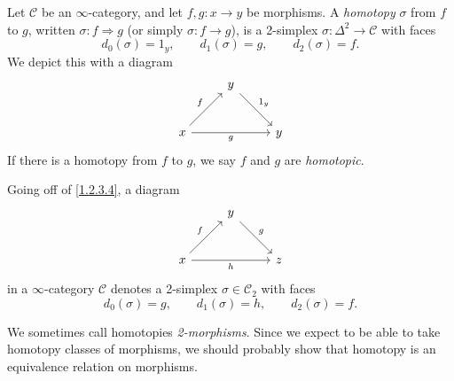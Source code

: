 \begin{definition}\label{1.2.3.4}
	Let $\mathcal{C} $ be an $\infty $-category, and let $f,g : x \to y$ be morphisms. A \emph{homotopy} $\sigma $ from $f$ to $g$, written $\sigma : f \Rightarrow g$ (or simply $\sigma : f \to g$), is a 2-simplex $\sigma : \Delta ^2 \to \mathcal{C} $ with faces
	\[
		d_0(\sigma )=1_y,\qquad d_1(\sigma )=g,\qquad d_2(\sigma )=f
	.\]
	We depict this with a diagram
	\[\begin{tikzcd}[row sep = 2.5em, column sep = 2.5em]
	 & y \ar[" 1_y ", dr]  &  \\
	x \ar[" f ", ur] \ar[" g "', rr]  &  & y
	\end{tikzcd}\]
	If there is a homotopy from $f$ to $g$, we say $f$ and $g$ are \emph{homotopic}.
\end{definition}

\begin{notation}\label{1.2.3.5}
	Going off of \cref{1.2.3.4}, a diagram
	\[\begin{tikzcd}[row sep = 2.5em, column sep = 2.5em]
	 & y \ar[" g ", dr]  &  \\
	x \ar[" f ", ur] \ar[" h "', rr]  &  & z
	\end{tikzcd}\]
	in a $\infty $-category $\mathcal{C} $ denotes a 2-simplex $\sigma \in \mathcal{C} _2$ with faces
	\[
		d_0(\sigma )=g,\qquad d_1(\sigma )=h,\qquad d_2(\sigma )=f
	.\]
\end{notation}

We sometimes call homotopies \emph{2-morphisms}. Since we expect to be able to take homotopy classes of morphisms, we should probably show that homotopy is an equivalence relation on morphisms.


